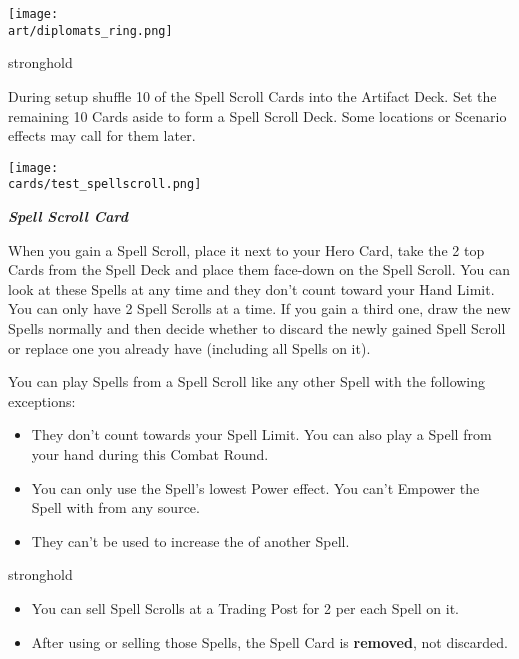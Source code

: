 \begin{multicols*}{2}
\begin{center}
  \vspace*{\fill}
  {\texttt{[image: \\art/diplomats\_ring.png]}}
  \vspace*{\fill}
\end{center}

\pagebreak

\begin{expansion}{stronghold}

During setup shuffle 10 of the Spell Scroll Cards into the Artifact Deck.
Set the remaining 10 Cards aside to form a Spell Scroll Deck.
Some locations or Scenario effects may call for them later.
\vspace*{1em}

{
    \medskip
    \centering
    \texttt{[image: \\cards/test\_spellscroll.png]}\\
    \medskip
    \footnotesize
    \begin{center}
         \textbf{\textit{\textcolor{darkcandyapplered}{Spell Scroll Card}}}
    \end{center}
}

\vspace*{1em}
When you gain a Spell Scroll, place it next to your Hero Card, take the 2 top Cards from the Spell Deck and place them face-down on the Spell Scroll.
You can look at these Spells at any time and they don't count toward your Hand  Limit.
You can only have 2 Spell Scrolls at a time.
If you gain a third one, draw the new Spells normally and then decide whether to discard the newly gained Spell Scroll or replace one you already have (including all Spells on it).

\medskip

You can play Spells from a Spell Scroll like any other Spell with the following exceptions:
\begin{itemize}
    \item They don't count towards your Spell Limit.
    You can also play a Spell from your hand during this Combat Round.
    \item You can only use the Spell's lowest Power  effect.
    You can't Empower the Spell with  from any source.
    \item They can't be used to increase the  of another Spell.
\end{itemize}
\end{expansion}
\columnbreak
\begin{expansion}{stronghold}
    \begin{itemize}
    \item You can sell Spell Scrolls at a Trading Post for 2  per each Spell on it.
    \item After using or selling those Spells, the Spell Card is \textbf{removed}, not discarded.
\end{itemize}


\end{expansion}
\end{multicols*}
